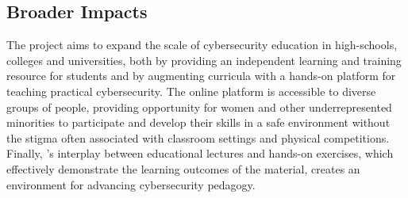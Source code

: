 {\subsection*{Broader Impacts}
The project aims to expand the scale of cybersecurity education in
high-schools, colleges and universities, both by providing an independent
learning and training resource for students and by augmenting curricula with a hands-on platform for
teaching practical cybersecurity. 
%
The online platform is accessible to diverse groups of people, providing
opportunity for women and other underrepresented minorities to participate and
develop their skills in a safe environment without the stigma often associated
with classroom settings and physical competitions. %
%
%
Finally, \core's interplay between educational lectures and hands-on exercises,
which effectively demonstrate the learning outcomes of the material, 
creates an environment for advancing cybersecurity pedagogy.
}


